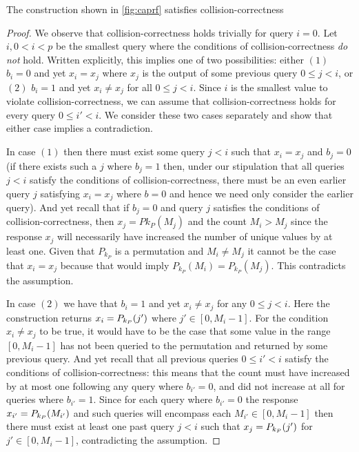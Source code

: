 \begin{theorem}
	The construction shown in \cref{fig:caprf} satisfies collision-correctness
\end{theorem}
\begin{proof}
	We observe that collision-correctness holds trivially for query $i=0$.
	Let $i, 0 < i < p$ be the smallest query where the conditions of collision-correctness {\em do not} hold.
	Written explicitly, this implies one of two possibilities: either $(1)$ $b_i = 0$ and yet $x_i = x_j$ where $x_j$ is the output of some previous query $0 \le j < i$, or $(2)$ $b_i = 1$ and yet $x_i \ne x_j$ for all $0 \le j < i$.
	Since $i$ is the smallest value to violate collision-correctness, we can assume that collision-correctness holds for every query $0 \le i' < i$. We consider these two cases separately and show that either case implies a contradiction.

	In case $(1)$ then there must exist some query $j < i$ such that $x_i = x_j$ and $b_j =0$
	(if there exists such a $j$ where $b_j=1$ then, under our stipulation  that all queries $j <i$ satisfy the conditions of collision-correctness, there must be an even earlier query $j$ satisfying $x_i = x_j$ where $b=0$ and hence we need only consider the earlier query).
	And yet recall that if $b_j=0$ and query $j$ satisfies the conditions of collision-correctness, then
	$x_j = P{k_{P}}(M_j)$ and the count $M_i > M_j$ since the response $x_j$ will necessarily have increased the number of unique values by at least one.
	Given that $P_{k_{P}}$ is a permutation and $M_i \ne M_j$ it cannot be the case that $x_i = x_j$ because that would imply $P_{k_{P}}(M_i) = P_{k_{P}}(M_j)$.
	This contradicts the assumption.

	In case $(2)$ we have that $b_i = 1$ and yet $x_i \ne x_j$ for any $0 \le j < i$.
	Here the construction returns $x_i = P_{k_{P}}(j')$ where $j' \in [0,M_i - 1]$.
	For the condition $x_i \ne x_j$ to be true, it would have to be the case that some value in the range $[0,M_i - 1]$ has not been queried to the permutation and returned by some previous query.
	And yet recall that all previous queries $0 \le i' < i$ satisfy the conditions of collision-correctness: this means that the count must have increased by at most one following any query where $b_{i'} = 0$, and did not increase at all for queries where $b_{i'} = 1$.
	Since for each query where $b_{i'} = 0$ the response $x_{i'} = P_{k_{P}}(M_{i'})$ and such queries will encompass each $M_{i'} \in [0, M_{i} - 1]$ then there must exist at least one past query $j < i$ such that $x_j = P_{k_{P}}(j')$ for $j' \in [0, M_i -1]$, contradicting the assumption.
\end{proof}

